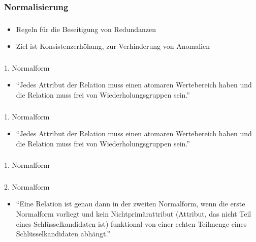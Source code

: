 \documentclass[aspectratio=169,14pt,xcolor=dvipsnames]{beamer}
\begin{document}
\begin{frame}[t]
    \frametitle{\subsecname}
    \framesubtitle{\subsubsecname}
    
\end{frame}

\subsubsection{Normalisierung}
\begin{frame}[t]
    \frametitle{\subsecname}
    \framesubtitle{\subsubsecname}
    \begin{itemize}
        \item Regeln für die Beseitigung von Redundanzen
        \item Ziel ist Konsistenzerhöhung, zur Verhinderung von Anomalien
    \end{itemize}
\end{frame}

\begin{frame}[t]
    \frametitle{\subsecname}
    \framesubtitle{\subsubsecname}
    1. Normalform
    \begin{itemize}
        \item "`Jedes Attribut der Relation muss einen atomaren Wertebereich haben und die Relation muss frei von Wiederholungsgruppen sein."'
    \end{itemize}
    \pause
    
\end{frame}

\begin{frame}[t]
    \frametitle{\subsecname}
    \framesubtitle{\subsubsecname}
    1. Normalform
    \begin{itemize}
        \item "`Jedes Attribut der Relation muss einen atomaren Wertebereich haben und die Relation muss frei von Wiederholungsgruppen sein."'
    \end{itemize}
    
\end{frame}

\begin{frame}[t]
    \frametitle{\subsecname}
    \framesubtitle{\subsubsecname}
    1. Normalform
    
\end{frame}

\begin{frame}[t]
    \frametitle{\subsecname}
    \framesubtitle{\subsubsecname}
    2. Normalform
    \begin{itemize}
        \item "`Eine Relation ist genau dann in der zweiten Normalform, wenn die erste Normalform vorliegt und kein Nichtprimärattribut (Attribut, das nicht Teil eines Schlüsselkandidaten ist) funktional von einer echten Teilmenge eines Schlüsselkandidaten abhängt."'
    \end{itemize}
    \pause 
    
\end{frame}
\end{document}
